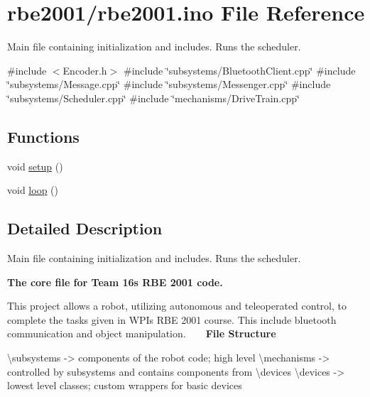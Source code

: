 \hypertarget{rbe2001_8ino}{}\section{rbe2001/rbe2001.ino File Reference}
\label{rbe2001_8ino}


Main file containing initialization and includes. Runs the scheduler.  


{\ttfamily \#include $<$Encoder.\+h$>$}\newline
{\ttfamily \#include \char`\"{}subsystems/\+Bluetooth\+Client.\+cpp\char`\"{}}\newline
{\ttfamily \#include \char`\"{}subsystems/\+Message.\+cpp\char`\"{}}\newline
{\ttfamily \#include \char`\"{}subsystems/\+Messenger.\+cpp\char`\"{}}\newline
{\ttfamily \#include \char`\"{}subsystems/\+Scheduler.\+cpp\char`\"{}}\newline
{\ttfamily \#include \char`\"{}mechanisms/\+Drive\+Train.\+cpp\char`\"{}}\newline
\subsection*{Functions}
\begin{DoxyCompactItemize}
\item 
void \hyperlink{rbe2001_8ino_a4fc01d736fe50cf5b977f755b675f11d}{setup} ()
\item 
void \hyperlink{rbe2001_8ino_afe461d27b9c48d5921c00d521181f12f}{loop} ()
\end{DoxyCompactItemize}


\subsection{Detailed Description}
Main file containing initialization and includes. Runs the scheduler. 

{\bfseries The core file for Team 16\textquotesingle{}s R\+BE 2001 code.}

This project allows a robot, utilizing autonomous and teleoperated control, to complete the tasks given in W\+PI\textquotesingle{}s R\+BE 2001 course. This include bluetooth communication and object manipulation. ~\newline
~\newline
 {\bfseries File Structure} 
\begin{DoxyPre}
    \textbackslash{}subsystems
        -> components of the robot code; high level
    \textbackslash{}mechanisms
        -> controlled by subsystems and contains components from \textbackslash{}devices
    \textbackslash{}devices
        -> lowest level classes; custom wrappers for basic devices
    \end{DoxyPre}


